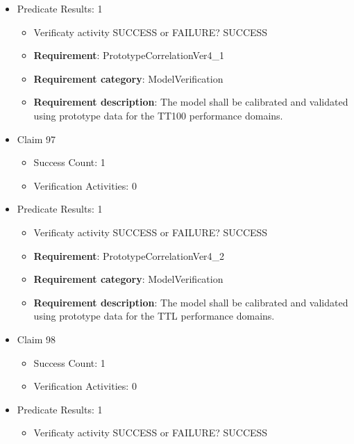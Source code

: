 \documentclass{article}
\begin{document}
\begin{itemize}
									    
				\item Predicate Results: 1
					\begin{itemize}				
					\item Verificaty activity SUCCESS or FAILURE? SUCCESS
					
					\item \textbf{Requirement}: PrototypeCorrelationVer4_1 
					\item \textbf{Requirement category}: ModelVerification
					\item \textbf{Requirement description}: The model shall be calibrated and validated using prototype data for the TT100 performance domains.
					\end{itemize}

  				  \item Claim 97
				\begin{itemize}
			    	\item Success Count: 1 
			    	\item Verification Activities: 0
				\end{itemize}
				
									    
				\item Predicate Results: 1
					\begin{itemize}				
					\item Verificaty activity SUCCESS or FAILURE? SUCCESS
					
					\item \textbf{Requirement}: PrototypeCorrelationVer4_2 
					\item \textbf{Requirement category}: ModelVerification
					\item \textbf{Requirement description}: The model shall be calibrated and validated using prototype data for the TTL performance domains.
					\end{itemize}

  				  \item Claim 98
				\begin{itemize}
			    	\item Success Count: 1 
			    	\item Verification Activities: 0
				\end{itemize}
				
									    
				\item Predicate Results: 1
					\begin{itemize}				
					\item Verificaty activity SUCCESS or FAILURE? SUCCESS
					

\end{itemize}
\end{itemize}
\end{document}
